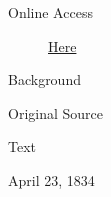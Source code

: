 				\begin{description}
					\item[Online Access] \href{https://www.josephsmithpapers.org/paper-summary/revelation-23-april-1834-dc-104/1}{Here}
				\end{description}
				
				\begin{description}
					\item[Background]
				\end{description}
				
				
				\begin{description}
					\item[Original Source]
				\end{description}
				
				
				\begin{description}
					\item[Text]
				\end{description}
					
					\begin{tightcenter}
					April 23, 1834
					\end{tightcenter}
					
